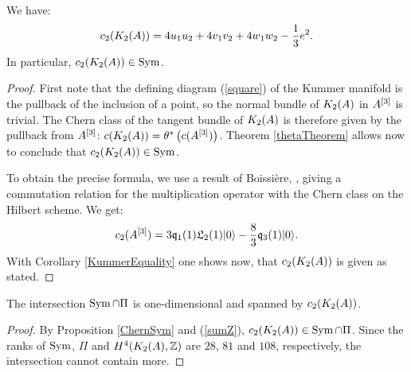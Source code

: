 \begin{proposition} \label{ChernSym}
We have:
\begin{equation}
c_2(K_{ 2 }( A ))= 4 u_1u_2 + 4v_1v_2 + 4 w_1 w_2 - \frac{1}{3} e^2. 
\end{equation}
In particular, $c_2(K_{ 2 }( A ))\in \operatorname{Sym} $.
\end{proposition}
\begin{proof}
First note that the defining diagram (\ref{square}) of the Kummer manifold is the pullback of the inclusion of a point, so the normal bundle of $K_{ 2 }( A )$ in $A^{[3]}$ is trivial. The Chern class of the tangent bundle of $K_{ 2 }( A )$ is therefore given by the pullback from $A^{[3]}$: $c(K_{ 2 }( A )) = \theta^*\left(c(A^{[3]})\right)$. Theorem \ref{thetaTheorem} allows now to conclude that $c_2(K_{ 2 }( A ))\in \operatorname{Sym}$.

To obtain the precise formula, we use a result of Boissi\`ere, \cite[Lemma 3.12]{Boissiere}, giving a commutation relation for the multiplication operator with the Chern class on the Hilbert scheme. We get:
$$
c_2(A^{[3]}) = 3\mathfrak{q}_1(1)\mathfrak L_2(1)|0\rangle - \frac{8}{3} \mathfrak{q}_3(1)|0\rangle.
$$
With Corollary \ref{KummerEquality} one shows now, that $c_2(K_{ 2 }( A ))$ is given as stated.
\end{proof}


\begin{corollary}\label{Pi'}
The intersection $\operatorname{Sym}\cap \Pi$ is one-dimensional and spanned by $c_2(K_{ 2 }( A ))$. 
\end{corollary}
\begin{proof}
By Proposition \ref{ChernSym} and (\ref{sumZ}), $c_2(K_{ 2 }( A ))\in \operatorname{Sym}\cap \Pi$. Since the ranks of $\operatorname{Sym}$, $\Pi$ and $H^4(K_{ 2 }( A ),\mathbb{Z})$ are $28$, $81$ and $108$, respectively, the intersection cannot contain more.
\end{proof}

